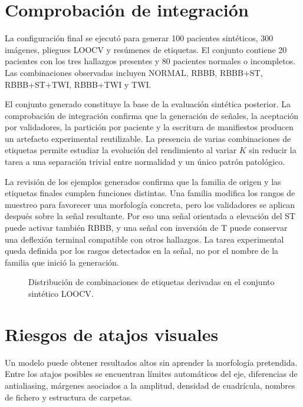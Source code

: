 \section{Comprobación de integración}

La configuración final se ejecutó para generar 100 pacientes sintéticos, 300 imágenes, pliegues LOOCV y resúmenes de etiquetas. El conjunto contiene 20 pacientes con los tres hallazgos presentes y 80 pacientes normales o incompletos. Las combinaciones observadas incluyen NORMAL, RBBB, RBBB+ST, RBBB+ST+TWI, RBBB+TWI y TWI.

El conjunto generado constituye la base de la evaluación sintética posterior. La comprobación de integración confirma que la generación de señales, la aceptación por validadores, la partición por paciente y la escritura de manifiestos producen un artefacto experimental reutilizable. La presencia de varias combinaciones de etiquetas permite estudiar la evolución del rendimiento al variar \(K\) sin reducir la tarea a una separación trivial entre normalidad y un único patrón patológico.

La revisión de los ejemplos generados confirma que la familia de origen y las etiquetas finales cumplen funciones distintas. Una familia modifica los rangos de muestreo para favorecer una morfología concreta, pero los validadores se aplican después sobre la señal resultante. Por eso una señal orientada a elevación del ST puede activar también RBBB, y una señal con inversión de T puede conservar una deflexión terminal compatible con otros hallazgos. La tarea experimental queda definida por los rasgos detectados en la señal, no por el nombre de la familia que inició la generación.

\begin{figure}[H]
  \centering
  \caption{Distribución de combinaciones de etiquetas derivadas en el conjunto sintético LOOCV.}
  \label{fig:label_distribution}
\end{figure}

\section{Riesgos de atajos visuales}

Un modelo puede obtener resultados altos sin aprender la morfología pretendida. Entre los atajos posibles se encuentran límites automáticos del eje, diferencias de antialiasing, márgenes asociados a la amplitud, densidad de cuadrícula, nombres de fichero y estructura de carpetas.

